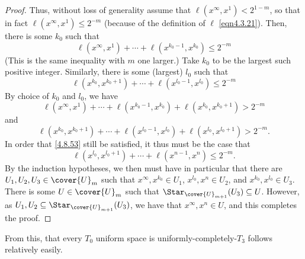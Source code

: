 \begin{thm}{}{}
\begin{proof}
Thus, without loss of generality assume that $\ell (x^\infty,x^1)<2^{1-m}$, so that in fact $\ell (x^{\infty},x^1)\leq 2^{-m}$ (because of the definition of $\ell$ \eqref{eqn4.3.21}).  Then, there is some $k_0$ such that
\begin{equation}
\ell (x^\infty,x^1)+\cdots +\ell (x^{k_0-1},x^{k_0})\leq 2^{-m}
\end{equation}
(This is the same inequality with $m$ one larger.)  Take $k_0$ to be the largest such positive integer.  Similarly, there is some (largest) $l_0$ such that
\begin{equation}
\ell (x^{k_0},x^{k_0+1})+\cdots +\ell (x^{l_0-1},x^{l_0})\leq 2^{-m}
\end{equation}
By choice of $k_0$ and $l_0$, we have
\begin{equation*}
\ell (x^{\infty},x^1)+\cdots +\ell (x^{k_0-1},x^{k_0})+\ell (x^{k_0},x^{k_0+1})>2^{-m}
\end{equation*}
and
\begin{equation*}
\ell (x^{k_0},x^{k_0+1})+\cdots +\ell (x^{l_0-1},x^{l_0})+\ell (x^{l_0},x^{l_0+1})>2^{-m}.
\end{equation*}
In order that \eqref{4.8.53} still be satisfied, it thus must be the case that
\begin{equation}
\ell (x^{l_0},x^{l_0+1})+\cdots +\ell (x^{n-1},x^n)\leq 2^{-m}.
\end{equation}
By the induction hypotheses, we then must have in particular that there are $U_1,U_2,U_3\in \cover{U}_{m}$ such that $x^\infty,x^{k_0}\in U_1$, $x^{l_0},x^n\in U_2$, and $x^{k_0},x^{l_0}\in U_3$.  There is some $U\in \cover{U}_m$ such that $\Star _{\cover{U}_{m+1}}(U_3)\subseteq U$.  However, as $U_1,U_2\subseteq \Star _{\cover{U}_{m+1}}(U_3)$, we have that $x^{\infty},x^n\in U$, and this completes the proof.
\end{proof}
\end{thm}
From this, that every $T_0$ uniform space is uniformly-completely-$T_3$ follows relatively easily.
